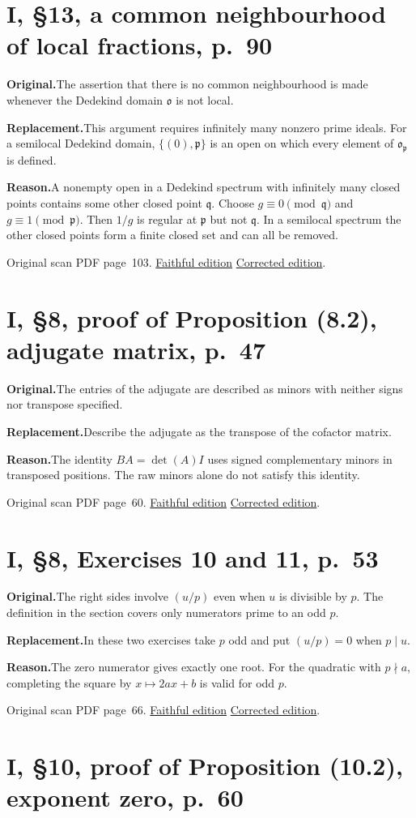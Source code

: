 \documentclass[11pt,a4paper]{article}
\newcommand{\original}{\par\smallskip\noindent\textbf{Original.}\enspace}
\newcommand{\replacement}{\par\smallskip\noindent\textbf{Replacement.}\enspace}
\newcommand{\reason}{\par\smallskip\noindent\textbf{Reason.}\enspace}
\newcommand{\editionlink}[3]{\href{#1\#errata.#2}{#3}}
\newcommand{\location}[2]{%
  \par\smallskip\noindent Original scan PDF page~#2.\enspace
  \editionlink{Neukirch_Faithful.pdf}{#1}{Faithful edition}
  \quad\editionlink{Neukirch_Corrected.pdf}{#1}{Corrected edition}.}
\begin{document}
\setcounter{section}{53}
\section{I, \S13, a common neighbourhood of local fractions, p.~90}\label{errata:item:54}

\original The assertion that there is no common neighbourhood is made whenever the Dedekind domain $\mathfrak o$ is not local.
\replacement This argument requires infinitely many nonzero prime ideals. For a semilocal Dedekind domain, $\{(0),\mathfrak p\}$ is an open on which every element of $\mathfrak o_{\mathfrak p}$ is defined.
\reason A nonempty open in a Dedekind spectrum with infinitely many closed points contains some other closed point $\mathfrak q$. Choose $g\equiv0\pmod{\mathfrak q}$ and $g\equiv1\pmod{\mathfrak p}$. Then $1/g$ is regular at $\mathfrak p$ but not $\mathfrak q$. In a semilocal spectrum the other closed points form a finite closed set and can all be removed.
\location{54}{103}

\setcounter{section}{54}
\section{I, \S8, proof of Proposition (8.2), adjugate matrix, p.~47}\label{errata:item:55}

\original The entries of the adjugate are described as minors with neither signs nor transpose specified.
\replacement Describe the adjugate as the transpose of the cofactor matrix.
\reason The identity $BA=\det(A)I$ uses signed complementary minors in transposed positions. The raw minors alone do not satisfy this identity.
\location{55}{60}

\setcounter{section}{55}
\section{I, \S8, Exercises 10 and 11, p.~53}\label{errata:item:56}

\original The right sides involve $(u/p)$ even when $u$ is divisible by $p$. The definition in the section covers only numerators prime to an odd $p$.
\replacement In these two exercises take $p$ odd and put $(u/p)=0$ when $p\mid u$.
\reason The zero numerator gives exactly one root. For the quadratic with $p\nmid a$, completing the square by $x\mapsto2ax+b$ is valid for odd $p$.
\location{56}{66}

\setcounter{section}{56}
\section{I, \S10, proof of Proposition (10.2), exponent zero, p.~60}\label{errata:item:57}
\end{document}
